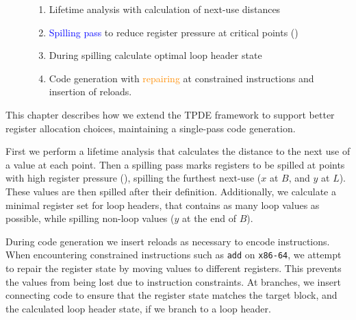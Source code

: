 \begin{figure}[h]
\begin{minipage}[l]{0.59\textwidth}
\begin{flushleft}
    \end{flushleft}
\end{minipage}
\hfill
\begin{minipage}[r]{0.4\textwidth}
    \begin{enumerate}
        \item Lifetime analysis with calculation of next-use distances
        \item[2.1.] \textcolor{blue}{Spilling pass} to reduce register pressure at critical points (\regpressure{})
        \item[2.2.] During spilling calculate \textcolor{TBpurple}{optimal loop header state }
        \item[3.] \textcolor{TBgreen}{Code generation} with \textcolor{darkorange}{repairing} at \textcolor{TBred}{constrained instructions} and insertion of reloads. 
    \end{enumerate}
\end{minipage}
\end{figure}

This chapter describes how we extend the TPDE framework to support better register allocation choices, maintaining a single-pass code generation.

First we perform a lifetime analysis that calculates the distance to the next use of a value at each point.
Then a spilling pass marks registers to be spilled at points with high register pressure (\regpressure{}), spilling the furthest next-use ($x$ at $B$, and $y$ at $L$). These values are then spilled after their definition. 
Additionally, we calculate a minimal register set for loop headers, that contains as many loop values as possible, while spilling non-loop values ($y$ at the end of $B$).

During code generation we insert reloads as necessary to encode instructions. When encountering constrained instructions such as \texttt{add} on \texttt{x86-64}, we attempt to repair the register state by moving values to different registers. This prevents the values from being lost due to instruction constraints.
At branches, we insert connecting code to ensure that the register state matches the target block, and the calculated loop header state, if we branch to a loop header.

